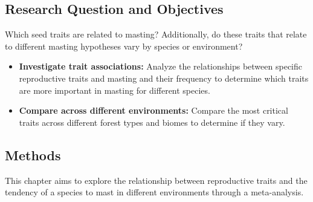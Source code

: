 \documentclass[11pt,letter]{article}
\begin{document}
\subsection{Research Question and Objectives}
Which seed traits are related to masting? Additionally, do these traits that relate to different masting hypotheses vary by species or environment?
	\begin{itemize}
	\item \textbf{Investigate trait associations:} Analyze the relationships between specific reproductive traits and masting and their frequency to determine which traits are more important in masting for different species.
	\item \textbf{Compare across different environments:} Compare the most critical traits across different forest types and biomes to determine if they vary.
	\end{itemize}
\subsection{Methods}
This chapter aims to explore the relationship between reproductive traits and the tendency of a species to mast in different environments through a meta-analysis.
\end{document}
